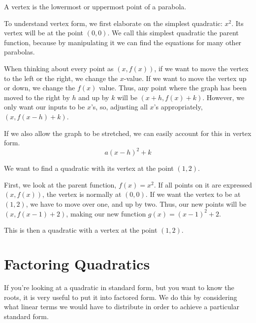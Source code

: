 \begin{defn}[Vertex]\label{Vertex}

A vertex is the lowermost or uppermost point of a parabola.
\end{defn}

To understand vertex form, we first elaborate on the simplest quadratic: $x^2$.  Its vertex will be at the point $(0,0)$. We call this simplest quadratic the parent function, because by manipulating it we can find the equations for many other parabolas. 

When thinking about every point as $(x, f(x))$, if we want to move the vertex to the left or the right, we change the $x$-value.  If we want to move the vertex up or down, we change the $f(x)$ value.  Thus, any point where the graph has been moved to the right by $h$ and up by $k$ will be $(x + h, f(x) + k)$.  However, we only want our inputs to be $x$'s, so, adjusting all $x$'s appropriately, $(x, f(x-h)+k)$.

If we also allow the graph to be stretched, we can easily account for this in vertex form.  $$a(x-h)^2 + k$$

\begin{presentation}
\begin{example}

We want to find a quadratic with its vertex at the point $(1,2)$.

First, we look at the parent function, $f(x) = x^2$.  If all points on it are expressed $(x, f(x))$, the vertex is normally at $(0,0)$.  If we want the vertex to be at $(1,2)$, we have to move over one, and up by two.  Thus, our new points will be $(x, f(x-1)+2)$, making our new function $g(x) = (x-1)^2 + 2$.

This is then a quadratic with a vertex at the point $(1,2)$.

\end{example}
\end{presentation}

\section*{Factoring Quadratics}

If you're looking at a quadratic in standard form, but you want to know the roots, it is very useful to put it into factored form.  We do this by considering what linear terms we would have to distribute in order to achieve a particular standard form.

